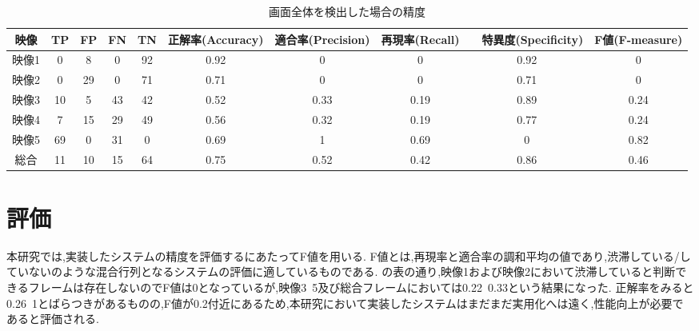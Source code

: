 \begin{table}[htbp]
  \centering
  \begin{scriptsize}
  \begin{tabular}{cccccccccc}
  \toprule
映像 & TP & FP & FN & TN & 正解率(Accuracy) & 適合率(Precision) & 再現率(Recall) &　特異度(Specificity) & F値(F-measure) \\
  \midrule
映像1 & 0 & 8 & 0 & 92 & 0.92 & 0 & 0 & 0.92 & 0 \\
映像2 & 0 & 29 & 0 & 71 & 0.71 & 0 & 0 & 0.71 & 0 \\
映像3 & 10 & 5 & 43 & 42 & 0.52 & 0.33 & 0.19 & 0.89 & 0.24 \\
映像4 & 7 & 15 & 29 & 49 & 0.56 & 0.32 & 0.19 & 0.77 & 0.24 \\
映像5 & 69 & 0 & 31 & 0 & 0.69 & 1 & 0.69 & 0 & 0.82 \\
総合 & 11 & 10 & 15 & 64 & 0.75 & 0.52 & 0.42 & 0.86 & 0.46 \\
\bottomrule
\end{tabular}
\end{scriptsize}
  \caption{画面全体を検出した場合の精度}
  \label{tab:mAP_fig_noweght}
\end{table}

\section{評価}
本研究では,実装したシステムの精度を評価するにあたってF値を用いる.
F値とは,再現率と適合率の調和平均の値であり,渋滞している/していないのような混合行列となるシステムの評価に適しているものである.
の表の通り,映像1および映像2において渋滞していると判断できるフレームは存在しないのでF値は0となっているが,映像3~5及び総合フレームにおいては0.22~0.33という結果になった.
正解率をみると0.26~1とばらつきがあるものの,F値が0.2付近にあるため,本研究において実装したシステムはまだまだ実用化へは遠く,性能向上が必要であると評価される.
